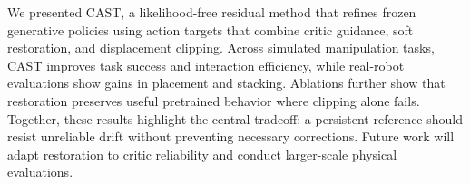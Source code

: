 We presented CAST, a likelihood-free residual method that refines frozen generative policies using action targets that combine critic guidance, soft restoration, and displacement clipping. Across simulated manipulation tasks, CAST improves task success and interaction efficiency, while real-robot evaluations show gains in placement and stacking. Ablations further show that restoration preserves useful pretrained behavior where clipping alone fails. Together, these results highlight the central tradeoff: a persistent reference should resist unreliable drift without preventing necessary corrections. Future work will adapt restoration to critic reliability and conduct larger-scale physical evaluations.


